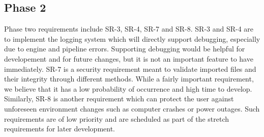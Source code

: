 \documentclass{article}
\begin{document}
\subsection{Phase 2}
Phase two requirements include SR-3, SR-4, SR-7 and SR-8. SR-3 and SR-4 are to implement the logging system which will
directly support debugging, especially due to engine and pipeline errors. Supporting debugging would be helpful for developement
and for future changes, but it is not an important feature to have immediately. SR-7 is a security requirement meant to
validate imported files and their integrity through different methods. While a fairly important requirement, we believe
that it has a low probability of occurrence and high time to develop. Similarly, SR-8 is another requirement which can
protect the user against unforeseen environment changes such as computer crashes or power outages. Such requirements are
of low priority and are scheduled as part of the stretch requirements for later development.
\end{document}
